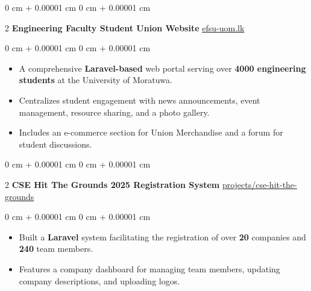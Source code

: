 \documentclass[10pt, letterpaper]{article}
\newenvironment{highlights}{ \begin{itemize}[ topsep=0.10 cm, parsep=0.10 cm, partopsep=0pt,
itemsep=0pt, leftmargin=0 cm + 10pt ] }{ \end{itemize} } %
\newenvironment{onecolentry}{ \begin{adjustwidth}{ 0 cm + 0.00001 cm }{ 0 cm + 0.00001 cm }
}{ \end{adjustwidth} } %
\newenvironment{twocolentry}[2][]{ \onecolentry \def\secondColumn{#2} \setcolumnwidth{\fill, 4.5 cm}
\begin{paracol}{2} }{ \switchcolumn \raggedleft \secondColumn \end{paracol}
\endonecolentry } %
\begin{document}
  \vspace{0.5 cm}

  \begin{twocolentry}
    {\href{https://efsu-uom.lk/}{efsu-uom.lk}} \textbf{Engineering Faculty Student Union Website}
  \end{twocolentry}
  \vspace{0.10 cm}
  \begin{onecolentry}
    \begin{highlights}
      \item A comprehensive \textbf{Laravel-based} web portal serving over
      \textbf{4000 engineering students} at the University of Moratuwa. \item
      Centralizes student engagement with news announcements, event management,
      resource sharing, and a photo gallery. \item Includes an e-commerce
      section for Union Merchandise and a forum for student discussions.
    \end{highlights}
  \end{onecolentry}

  \vspace{0.5 cm}

  \begin{twocolentry}
    {\href{https://suhasdissa.top/projects/cse-hit-the-grounds/}{projects/cse-hit-the-grounds}} \textbf{CSE Hit The Grounds
    2025 Registration System}
  \end{twocolentry}
  \vspace{0.10 cm}
  \begin{onecolentry}
    \begin{highlights}
      \item Built a \textbf{Laravel} system facilitating the registration of
      over \textbf{20} companies and \textbf{240} team members. \item Features a company dashboard for
      managing team members, updating company descriptions, and uploading logos.
    \end{highlights}
  \end{onecolentry}

  \vspace{0.5 cm}
\end{document}
